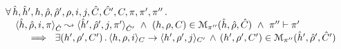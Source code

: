 
\begin{lemma}\label{lemma:soundness:single:step}
$$
\begin{array}{l}
\forall \, \sheap, \sheap', \heap, \sstore, \sstore', \store, i, j, \sctx, \sctx', \ctx, \pc, \pc', \pc'' \, . \,  \\ 
\quad \symbtrans{\sheap, \sstore, i, \pc}{\sheap', \sstore', j, \pc'}[\sctx][\sctx'] 
   \ \wedge \ 
      (\heap, \store, \ctx) \in \smodels{\sheap, \sstore, \sctx}{\pc''} 
            \ \wedge \ \pc'' \vdash \pc' \\ \quad \quad 
      	 \ \implies \ \exists (\heap', \store', \ctx') \, . \, 
	 	 \semtrans{\heap, \store, i}{\heap', \store', j}[\ctx][\ctx']
		\, \wedge \, 
		(\heap', \store', \ctx') \in \smodels{\sheap', \sstore', \sctx'}{\pc''}  
\end{array}
$$
\end{lemma}
%
